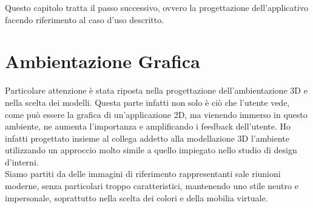 Questo capitolo tratta il passo successivo, ovvero la progettazione dell'applicativo facendo riferimento al caso d'uso descritto.

\section{Ambientazione Grafica}
Particolare attenzione è stata riposta nella progettazione dell'ambientazione 3D e nella scelta dei modelli. Questa parte infatti non solo è ciò che l'utente vede, come può essere la grafica di un'applicazione 2D, ma vienendo immerso in questo ambiente, ne aumenta l'importanza e amplificando i feedback dell'utente. Ho infatti progettato insieme al collega addetto alla modellazione 3D l'ambiente utilizzando un approccio molto simile a quello impiegato nello studio di design d'interni.\\

Siamo partiti da delle immagini di riferimento rappresentanti sale riunioni moderne, senza particolari troppo caratteristici, mantenendo uno stile neutro e impersonale, soprattutto nella scelta dei colori e della mobilia virtuale.\\

